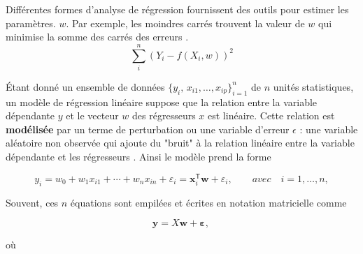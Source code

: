	Différentes formes d'analyse de régression fournissent des outils pour estimer les paramètres. $w$. Par exemple, les moindres carrés trouvent la valeur de $w$ qui minimise la somme des carrés des erreurs \cite{deepa2021ai}. $${\sum _{i}^n (Y_{i}-f(X_{i},w ))^{2}}$$ 
	
	Étant donné un ensemble de données ${\displaystyle \{y_{i},\,x_{i1},\ldots ,x_{ip}\}_{i=1}^{n}}$ de $n$ unités statistiques, un modèle de régression linéaire suppose que la relation entre la variable dépendante $y$ et le vecteur $w$ des régresseurs $x$ est linéaire. Cette relation est \textbf{modélisée} par un terme de perturbation ou une variable d'erreur $\epsilon$ : une variable aléatoire non observée qui ajoute du "bruit" à la relation linéaire entre la variable dépendante et les régresseurs \cite{antoine2018apprentissage, darlington2016regression}. Ainsi le modèle prend la forme
	
	$${\displaystyle y_{i}=w _{0}+w _{1}x_{i1}+\cdots +w _{n}x_{in}+\varepsilon _{i}=\mathbf { x} _{i}^{\mathsf {T}}{\boldsymbol {w }}+\varepsilon_{i},\qquad avec \quad i=1,\ldots ,n,}
	$$
	
	Souvent, ces $n$ équations sont empilées et écrites en notation matricielle comme
	
	\begin{equation}\label{eq:regression_generale}
		{\displaystyle \mathbf {y} =X{\boldsymbol {w}}+{\boldsymbol {\varepsilon}},\,}
	\end{equation}
	

	
	où
	
